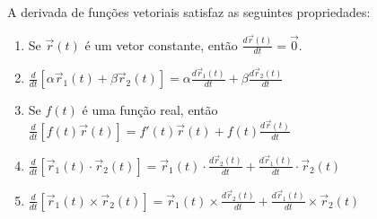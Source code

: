 \begin{teo} A derivada de funções vetoriais satisfaz as seguintes propriedades:
\begin{enumerate}
\item Se $\vec{r}(t)$ é um vetor constante, então $\frac{d\vec{r}(t)}{dt}=\vec{0}$. 
\item $\frac{d}{dt}\left[\alpha \vec{r}_1(t)+\beta \vec{r}_2(t)\right]=\alpha\frac{d\vec{r}_1(t)}{dt}+\beta\frac{d\vec{r}_2(t)}{dt}$
\item Se $f(t)$ é uma função real, então $\frac{d}{dt}\left[f(t) \vec{r}(t)\right]=f'(t)\vec{r}(t)+f(t)\frac{d\vec{r}(t)}{dt}$
\item $\frac{d}{dt}\left[\vec{r}_1(t)\cdot \vec{r}_2(t)\right]=\vec{r}_1(t)\cdot\frac{d\vec{r}_2(t)}{dt}+\frac{d\vec{r}_1(t)}{dt}\cdot\vec{r}_2(t)$
\item $\frac{d}{dt}\left[\vec{r}_1(t)\times \vec{r}_2(t)\right]=\vec{r}_1(t)\times\frac{d\vec{r}_2(t)}{dt}+\frac{d\vec{r}_1(t)}{dt}\times\vec{r}_2(t)$
\end{enumerate}
\end{teo}

